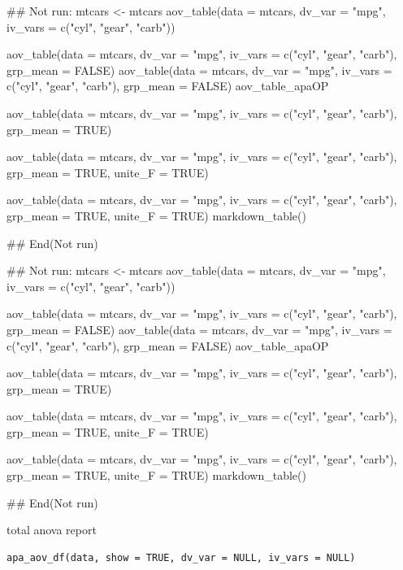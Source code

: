 \documentclass[a4paper]{book}
\begin{document}
\begin{Examples}
\begin{ExampleCode}

## Not run: 
mtcars <- mtcars%
aov_table(data = mtcars, dv_var = "mpg", iv_vars = c("cyl", "gear", "carb"))

aov_table(data = mtcars, dv_var = "mpg",
iv_vars = c("cyl", "gear", "carb"), grp_mean = FALSE)
aov_table(data = mtcars, dv_var = "mpg",
iv_vars = c("cyl", "gear", "carb"), grp_mean = FALSE) %
aov_table_apaOP

aov_table(data = mtcars, dv_var = "mpg",
 iv_vars = c("cyl", "gear", "carb"), grp_mean = TRUE)

aov_table(data = mtcars, dv_var = "mpg",
 iv_vars = c("cyl", "gear", "carb"), grp_mean = TRUE, unite_F = TRUE)

aov_table(data = mtcars, dv_var = "mpg",
 iv_vars = c("cyl", "gear", "carb"),
  grp_mean = TRUE, unite_F = TRUE) %
  markdown_table()

## End(Not run)




## Not run: 
mtcars <- mtcars%
aov_table(data = mtcars, dv_var = "mpg", iv_vars = c("cyl", "gear", "carb"))

aov_table(data = mtcars, dv_var = "mpg",
iv_vars = c("cyl", "gear", "carb"), grp_mean = FALSE)
aov_table(data = mtcars, dv_var = "mpg",
iv_vars = c("cyl", "gear", "carb"), grp_mean = FALSE) %
aov_table_apaOP

aov_table(data = mtcars, dv_var = "mpg",
 iv_vars = c("cyl", "gear", "carb"), grp_mean = TRUE)

aov_table(data = mtcars, dv_var = "mpg",
 iv_vars = c("cyl", "gear", "carb"), grp_mean = TRUE, unite_F = TRUE)

aov_table(data = mtcars, dv_var = "mpg",
 iv_vars = c("cyl", "gear", "carb"),
  grp_mean = TRUE, unite_F = TRUE) %
  markdown_table()

## End(Not run)



\end{ExampleCode}
\end{Examples}
%
\begin{Description}
total anova report
\end{Description}
%
\begin{Usage}
\begin{verbatim}
apa_aov_df(data, show = TRUE, dv_var = NULL, iv_vars = NULL)
\end{verbatim}
\end{Usage}
\end{document}
